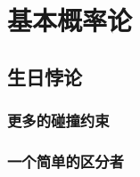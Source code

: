 \chapter{基本概率论}\label{chap:B}

\section{生日悖论}\label{sec:B-1}

\begin{theorem}\label{theo:B-1}

\end{theorem}

\begin{corollary}\label{cor:B-2}

\end{corollary}

\subsection{更多的碰撞约束}\label{subsec:B-1-1}

\subsection{一个简单的区分者}\label{subsec:B-1-2}

\begin{theorem}\label{theo:B-3}

\end{theorem}